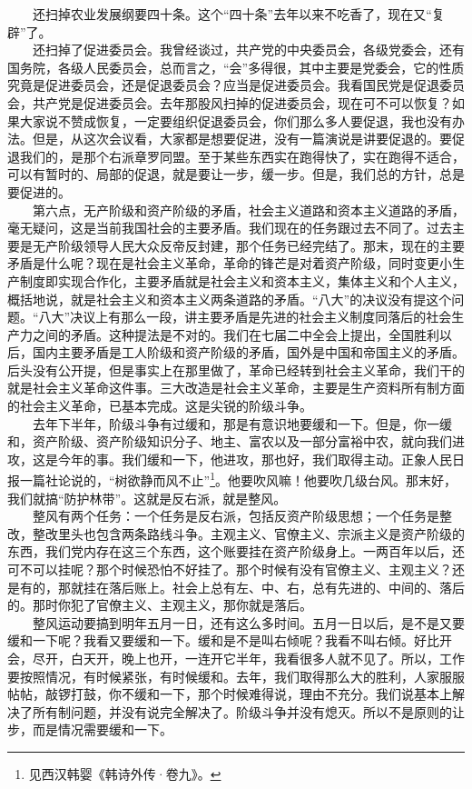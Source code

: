 \documentclass[cn,11pt,chinese]{elegantbook}
\begin{document}
　　还扫掉农业发展纲要四十条。这个“四十条”去年以来不吃香了，现在又“复辟”了。\\
　　还扫掉了促进委员会。我曾经谈过，共产党的中央委员会，各级党委会，还有国务院，各级人民委员会，总而言之，“会”多得很，其中主要是党委会，它的性质究竟是促进委员会，还是促退委员会？应当是促进委员会。我看国民党是促退委员会，共产党是促进委员会。去年那股风扫掉的促进委员会，现在可不可以恢复？如果大家说不赞成恢复，一定要组织促退委员会，你们那么多人要促退，我也没有办法。但是，从这次会议看，大家都是想要促进，没有一篇演说是讲要促退的。要促退我们的，是那个右派章罗同盟。至于某些东西实在跑得快了，实在跑得不适合，可以有暂时的、局部的促退，就是要让一步，缓一步。但是，我们总的方针，总是要促进的。\\
　　第六点，无产阶级和资产阶级的矛盾，社会主义道路和资本主义道路的矛盾，毫无疑问，这是当前我国社会的主要矛盾。我们现在的任务跟过去不同了。过去主要是无产阶级领导人民大众反帝反封建，那个任务已经完结了。那末，现在的主要矛盾是什么呢？现在是社会主义革命，革命的锋芒是对着资产阶级，同时变更小生产制度即实现合作化，主要矛盾就是社会主义和资本主义，集体主义和个人主义，概括地说，就是社会主义和资本主义两条道路的矛盾。“八大”的决议没有提这个问题。“八大”决议上有那么一段，讲主要矛盾是先进的社会主义制度同落后的社会生产力之间的矛盾。这种提法是不对的。我们在七届二中全会上提出，全国胜利以后，国内主要矛盾是工人阶级和资产阶级的矛盾，国外是中国和帝国主义的矛盾。后头没有公开提，但是事实上在那里做了，革命已经转到社会主义革命，我们干的就是社会主义革命这件事。三大改造是社会主义革命，主要是生产资料所有制方面的社会主义革命，已基本完成。这是尖锐的阶级斗争。\\
　　去年下半年，阶级斗争有过缓和，那是有意识地要缓和一下。但是，你一缓和，资产阶级、资产阶级知识分子、地主、富农以及一部分富裕中农，就向我们进攻，这是今年的事。我们缓和一下，他进攻，那也好，我们取得主动。正象人民日报一篇社论说的，“树欲静而风不止”\footnote[3]{ 见西汉韩婴《韩诗外传·卷九》。}。他要吹风嘛！他要吹几级台风。那末好，我们就搞“防护林带”。这就是反右派，就是整风。\\
　　整风有两个任务：一个任务是反右派，包括反资产阶级思想；一个任务是整改，整改里头也包含两条路线斗争。主观主义、官僚主义、宗派主义是资产阶级的东西，我们党内存在这三个东西，这个账要挂在资产阶级身上。一两百年以后，还可不可以挂呢？那个时候恐怕不好挂了。那个时候有没有官僚主义、主观主义？还是有的，那就挂在落后账上。社会上总有左、中、右，总有先进的、中间的、落后的。那时你犯了官僚主义、主观主义，那你就是落后。\\
　　整风运动要搞到明年五月一日，还有这么多时间。五月一日以后，是不是又要缓和一下呢？我看又要缓和一下。缓和是不是叫右倾呢？我看不叫右倾。好比开会，尽开，白天开，晚上也开，一连开它半年，我看很多人就不见了。所以，工作要按照情况，有时候紧张，有时候缓和。去年，我们取得那么大的胜利，人家服服帖帖，敲锣打鼓，你不缓和一下，那个时候难得说，理由不充分。我们说基本上解决了所有制问题，并没有说完全解决了。阶级斗争并没有熄灭。所以不是原则的让步，而是情况需要缓和一下。\\
\end{document}
